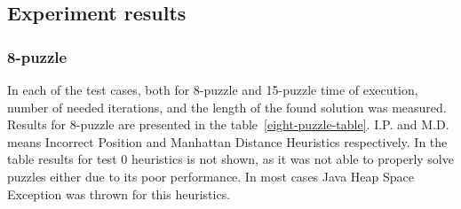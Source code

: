 \documentclass[12pt]{article}
\begin{document}
\subsection {Experiment results }

\subsubsection {8-puzzle}

In each of the test cases, both for 8-puzzle and 15-puzzle time of execution, number of needed iterations, and the length of the found solution was measured. Results for 8-puzzle are presented in the table~\ref{eight-puzzle-table}. I.P. and M.D. means Incorrect Position and Manhattan Distance Heuristics respectively. In the table results for test 0 heuristics is not shown, as it was not able to properly solve puzzles either due to its poor performance. In most cases Java Heap Space Exception was thrown for this heuristics.  
\end{document}
